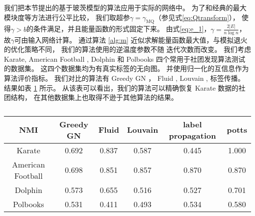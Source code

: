 \documentclass{ctexart}
\begin{document}
我们把本节提出的基于玻茨模型的算法应用于实际的网络中。
为了和经典的最大模块度等方法进行公平比较，
我们取超参$\gamma=\gamma_{\mathrm{MQ}}$（参见式\eqref{eq:Qtransform}），
使得$\gamma>b$的条件满足，并且能量函数的形式固定下来。
由式\eqref{eq:e_1}，$\gamma = \frac{2|E|}{n \log n}$，
故$\gamma$可由输入网络计算。
通过算法 \ref{alg:m} 近似求解能量函数最大值，与模拟退火的优化策略不同，
我们的算法使用的逆温度参数不随
迭代次数而改变。
我们考虑 Karate\cite{zachary1977information},
American Football \cite{girvan2002community},
Dolphin \cite{lusseau2003emergent}
和 Polbooks \cite{newman2006modularity}
四个常用于社团发现算法测试的数据集。
这四个数据集均为有真实标签的无向图。
并使用归一化的互信息\cite{Danon_2005}作为算法评价指标。
我们对比的算法有
Greedy GN \cite{clauset2004finding}，
Fluid \cite{pares2018fluid},
Louvain \cite{blondel2008fast},
标签传播\cite{cordasco2010community}。
结果如表 \ref{tab:flatten_result} 所示。
从该表可以看出，我们的算法可以精确恢复 Karate 数据的社团结构，
在其他数据集上也取得不逊于其他算法的结果。

\begin{table}
    \begin{adjustbox}{width=\columnwidth,center}
    \begin{tabular}{cccccc}
    \hline
    NMI               & Greedy GN & Fluid & Louvain  & label propagation & potts\\
    \hline
    Karate            & 0.692     & 0.837 & 0.587   & 0.445         & 1.000     \\
    American Football & 0.698     & 0.851 & 0.857    & 0.870         & 0.870    \\
    Dolphin           & 0.573     & 0.655 & 0.516    & 0.527        & 0.701     \\
    Polbooks          & 0.531     & 0.411 & 0.493  & 0.534          & 0.580     \\
    \hline
    \end{tabular}
\end{adjustbox}
    \caption{}\label{tab:flatten_result}
\end{table}



\end{document}
